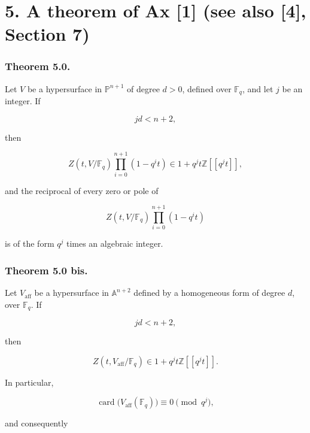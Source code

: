 \section*{5. A theorem of Ax [1] (see also [4], Section 7)}

\subsubsection*{Theorem 5.0.}
Let $V$ be a hypersurface in $\mathbb P^{n+1}$ of degree $d>0$, defined
over $\mathbb F_q$, and let $j$ be an integer.  If

\begin{equation}\tag{5.0.1}
jd<n+2,
\end{equation}

then

\begin{equation}\tag{5.0.2}
Z(t,V/\mathbb F_q)\prod_{i=0}^{n+1}(1-q^it)
\in1+q^jt\mathbb Z[[q^jt]],
\end{equation}

and the reciprocal of every zero or pole of

\begin{equation}\tag{5.0.3}
Z(t,V/\mathbb F_q)\prod_{i=0}^{n+1}(1-q^it)
\end{equation}

\noindent
is of the form $q^j$ times an algebraic integer.

\subsubsection*{Theorem 5.0 bis.}
Let $V_{\mathrm{aff}}$ be a hypersurface in $\mathbb A^{n+2}$ defined by a
homogeneous form of degree $d$, over $\mathbb F_q$.  If

\begin{equation}\tag{5.0.4}
jd<n+2,
\end{equation}

then

\begin{equation}\tag{5.0.5}
Z(t,V_{\mathrm{aff}}/\mathbb F_q)
\in1+q^jt\mathbb Z[[q^jt]].
\end{equation}

In particular,

\begin{equation}\tag{5.0.6}
\operatorname{card}\bigl(V_{\mathrm{aff}}(\mathbb F_q)\bigr)
\equiv0\pmod{q^j},
\end{equation}

and consequently

